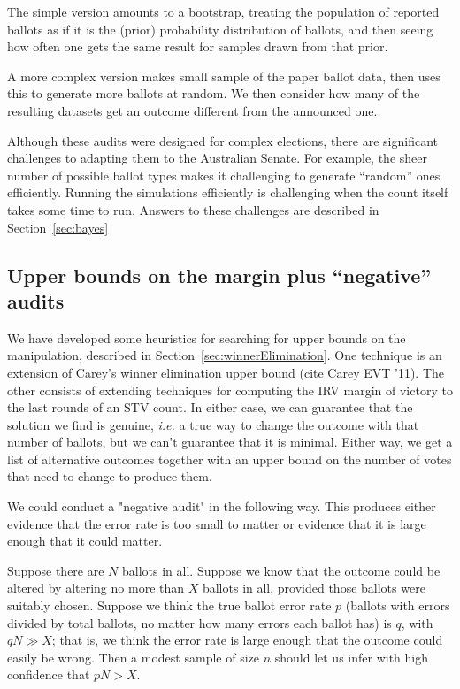 \documentclass[10pt,a4paper]{article}
\begin{document}
The simple version amounts to a bootstrap, treating the population of reported ballots as
if it is the (prior) probability distribution of ballots, and then seeing how often one gets the same result for samples drawn from that prior. 

A more complex version makes small sample of the paper ballot data, then uses this to generate more ballots at random.  We then consider how many of the resulting datasets get an outcome different from the announced one.  

Although these audits were designed for complex elections, there are significant challenges to adapting them to the Australian Senate.  For example, the sheer number of possible ballot types makes it challenging to generate ``random'' ones efficiently.  Running the simulations efficiently is challenging when the count itself takes some time to run.  Answers to these challenges are described in Section~\ref{sec:bayes}

\subsection{Upper bounds on the margin plus ``negative'' audits}
We have developed some heuristics for searching for upper bounds on the manipulation, described in Section~\ref{sec:winnerElimination}.  One technique is an extension of Carey's winner elimination upper bound (cite Carey EVT '11).  The other consists of extending techniques for computing the IRV margin of victory to the last rounds of an STV count.  In either case, we can guarantee that the solution we find is genuine, {\it i.e.} a true way to change the outcome with that number of ballots, but we can't guarantee that it is minimal.  Either way, we get a list of alternative outcomes together with an upper bound on the number of votes that need to change to produce them.

We could conduct a "negative audit" in the following way.  
This produces either evidence that the error rate is too small to matter or evidence that it is large enough that it could matter.

Suppose there are $N$ ballots in all.
Suppose we know that the outcome could be altered by altering no more than $X$ ballots in all, provided those ballots were suitably chosen.  Suppose
we think the true ballot error rate $p$ (ballots with errors divided by total ballots, no matter how many errors each ballot has) is $q$, with $qN \gg X$; that is, we think the error rate is large enough that the outcome could easily be wrong.  Then a modest sample
of size $n$ should let us infer with high confidence that $pN > X$. 
\end{document}
